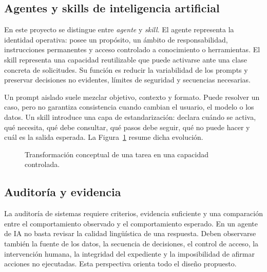 \documentclass[11pt,a4paper]{article}
\begin{document}
\subsection{Agentes y skills de inteligencia artificial}

En este proyecto se distingue entre \textit{agente} y \textit{skill}. El agente representa la identidad operativa: posee un propósito, un ámbito de responsabilidad, instrucciones permanentes y acceso controlado a conocimiento o herramientas. El skill representa una capacidad reutilizable que puede activarse ante una clase concreta de solicitudes. Su función es reducir la variabilidad de los prompts y preservar decisiones no evidentes, límites de seguridad y secuencias necesarias.

Un prompt aislado suele mezclar objetivo, contexto y formato. Puede resolver un caso, pero no garantiza consistencia cuando cambian el usuario, el modelo o los datos. Un skill introduce una capa de estandarización: declara cuándo se activa, qué necesita, qué debe consultar, qué pasos debe seguir, qué no puede hacer y cuál es la salida esperada. La Figura~\ref{fig:prompt-skill} resume dicha evolución.

\begin{figure}[H]
\centering
{}
\caption{Transformación conceptual de una tarea en una capacidad controlada.}
\label{fig:prompt-skill}
\end{figure}

\subsection{Auditoría y evidencia}

La auditoría de sistemas requiere criterios, evidencia suficiente y una comparación entre el comportamiento observado y el comportamiento esperado. En un agente de IA no basta revisar la calidad lingüística de una respuesta. Deben observarse también la fuente de los datos, la secuencia de decisiones, el control de acceso, la intervención humana, la integridad del expediente y la imposibilidad de afirmar acciones no ejecutadas. Esta perspectiva orienta todo el diseño propuesto.
\end{document}
